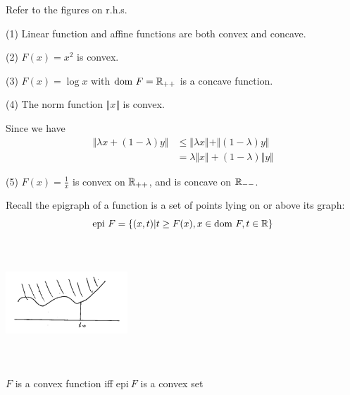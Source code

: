 \begin{example}

Refer to the figures on r.h.s.

	(1) Linear function and affine functions are both convex and concave.
	
	(2) $F(x)=x^2$ is convex.
	
	(3) $F(x) = \log x$ with $\text{dom}\ F = \mathbb{R}_{++}$ is a concave function.
	
	(4) The norm function $\Vert x\Vert$ is convex. 
	
	Since we have
	\begin{align*}
	\Vert \lambda x + (1-\lambda)y\Vert 
	&\leq \Vert \lambda x\Vert + \Vert(1-\lambda)y\Vert\\
	&=\lambda \Vert x \Vert + (1-\lambda)\Vert y \Vert
	\end{align*}
	
	(5) $F(x)=\frac{1}{x}$ is convex on $\mathbb{R}_{++}$, and is concave on $\mathbb{R}_{--}$.
	
\end{example}
	
\vspace{0.5cm}
\begin{definition}[Epigraph]
Recall the epigraph of a function is a set of points lying on or above its graph:
\begin{equation*}
\text{epi}\ F = \{(x,t)|t\geq F(x), x\in \text{dom}\ F, t\in\mathbb{R} \}
\end{equation*}
\end{definition}

\begin{marginfigure}
	\centering
	\includegraphics[width=1.8in,height=1.8in]{figures/ch08/figure1030_11.png}
\end{marginfigure}

\begin{definition}
	$F$ is a convex function iff $\text{epi}\ F$ is a convex set
\end{definition}

